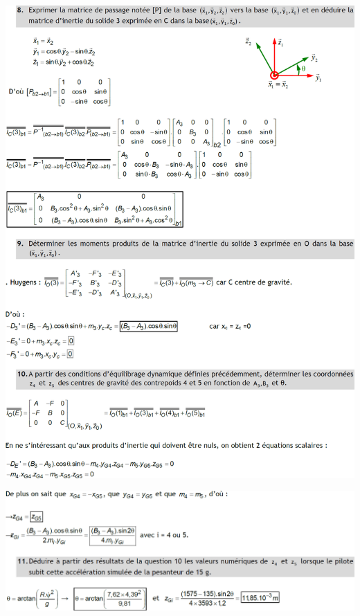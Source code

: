 \documentclass[10pt,fleqn]{article} %
\begin{document}
\begin{center}
\includegraphics[width=\linewidth]{images/cor_03.png}
\end{center}
\begin{center}
\includegraphics[width=\linewidth]{images/cor_04.png}
\end{center}
\end{document}

